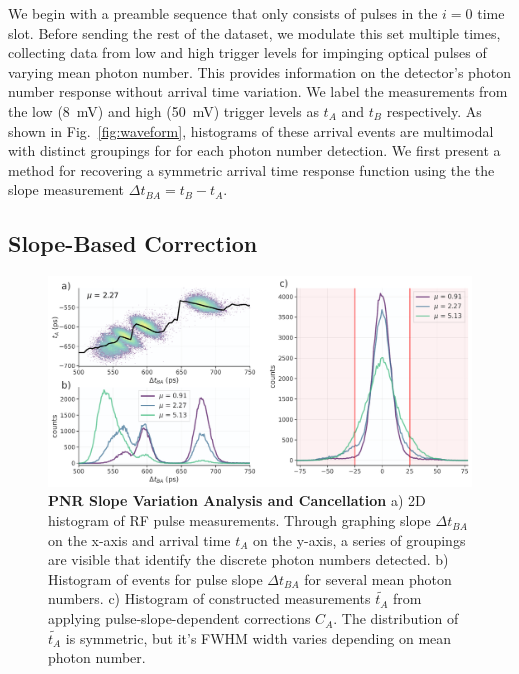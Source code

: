 \documentclass[11pt]{caltech_thesis} %
\begin{document}
We begin with a preamble sequence that only consists of pulses in the $i = 0$ time slot. Before sending the rest of the dataset, we modulate this set multiple times, collecting data from low and high trigger levels for impinging optical pulses of varying mean photon number. This provides information on the detector's photon number response without arrival time variation. We label the measurements from the low (8~mV) and high (50~mV) trigger levels as $t_A$ and $t_B$ respectively. As shown in Fig.~\ref{fig:waveform}, histograms of these arrival events are multimodal with distinct groupings for for each photon number detection. We first present a method for recovering a symmetric arrival time response function using the the slope measurement $\Delta t_{BA} = t_B - t_A$.

\hypertarget{slope-based-correction}{%
\subsection{Slope-Based Correction}\label{slope-based-correction}}

\hypertarget{fig:slope_correction}{%
\begin{figure}
\centering
\includegraphics[width=1\textwidth,height=\textheight]{./chapter_04/figs/slope_cancellation_light.pdf}
\caption[{PNR Slope Variation Analysis and Cancellation}]{\textbf{PNR Slope Variation Analysis and Cancellation} a) 2D histogram of RF pulse measurements. Through graphing slope $\Delta t_{BA}$ on the x-axis and arrival time $t_A$ on the y-axis, a series of groupings are visible that identify the discrete photon numbers detected. b) Histogram of events for pulse slope $\Delta t_{BA}$ for several mean photon numbers. c) Histogram of constructed measurements $\tilde{t_A}$ from applying pulse-slope-dependent corrections $C_A$. The distribution of $\tilde{t_A}$ is symmetric, but it's FWHM width varies depending on mean photon number.}
\label{fig:slope_correction}
\end{figure}
}
\end{document}
